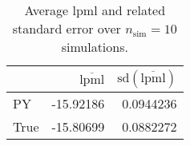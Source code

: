 \begin{table}[H]

\caption{Average lpml and related standard error over $n_{\text{sim}} = 10$ simulations.}
\centering
\begin{tabular}[t]{lrr}
\toprule
  & $\overbar{\text{lpml}}$ & $\text{sd}(\overbar{\text{lpml}})$\\
\midrule
PY & -15.92186 & 0.0944236\\
True & -15.80699 & 0.0882272\\
\bottomrule
\end{tabular}
\end{table}